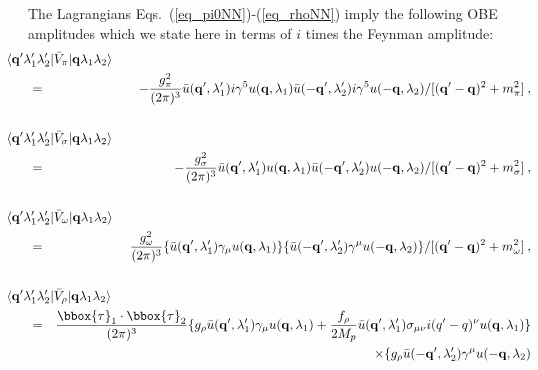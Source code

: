 The Lagrangians Eqs.~(\ref{eq_pi0NN})-(\ref{eq_rhoNN})
imply the following OBE amplitudes
which we state here in terms of $i$ times the Feynman amplitude:
\begin{eqnarray}
\lefteqn{\hspace{-.6cm}\langle {\bf  q'} \lambda_{1}'\lambda_{2}'
|\bar{V}_{\pi}|
{\bf  q}\lambda_{1}\lambda_{2}\rangle} \nonumber \\
 & = &
 - \frac{g^{2}_{\pi}
 }{(2\pi)^{3}}
  \bar{u}({\bf  q'},\lambda_{1}') i \gamma^{5}
 u({\bf  q},\lambda_{1}) 
 \bar{u}({\bf  -q'},\lambda_{2}') i \gamma^{5}
 u({\bf  -q},\lambda_{2}) 
 /[({\bf  q'-q})^{2}+m_{\pi}^{2}] 
\: ,
\label{31.6}\\
\nonumber \\
\lefteqn{\hspace{-.6cm}\langle {\bf  q'} \lambda_{1}'\lambda_{2}'
|\bar{V}_{\sigma}|
{\bf  q}\lambda_{1}\lambda_{2}\rangle}\nonumber \\
 & = & -\frac{g^{2}_{\sigma}}{(2\pi)^3}
\bar{u}({\bf  q'},\lambda_{1}')    u({\bf  q},\lambda_{1})
\bar{u}({\bf  -q'},\lambda_{2}')   u({\bf  -q},\lambda_{2})
  /[({\bf  q'-q})^{2}+m_{\sigma}^{2}] 
\: ,
\label{31.8}\\
\nonumber \\
\lefteqn{\hspace{-.6cm}\langle {\bf  q'} \lambda_{1}'\lambda_{2}'
|\bar{V}_{\omega}|
{\bf  q}\lambda_{1}\lambda_{2}\rangle}\nonumber \\
 &  = &
\frac{g^2_{\omega}}{(2\pi)^3} 
\{ \bar{u}({\bf  q'},\lambda_{1}')  
   \gamma_{\mu} u({\bf  q},\lambda_{1}) \}
\{ \bar{u}({\bf  -q'},\lambda_{2}')
  \gamma^{\mu} u({\bf  -q},\lambda_{2}) \}
  /[({\bf  q'-q})^{2}+m_{\omega}^{2}]
\: ,
\label{31.8a}\\
\nonumber \\
\lefteqn{\hspace{-.6cm}\langle {\bf  q'} \lambda_{1}'\lambda_{2}'
|\bar{V}_{\rho}|
{\bf  q}\lambda_{1}\lambda_{2}\rangle}\nonumber \\
 &  = &
 \frac{\bbox{\tau}_1 \cdot \bbox{\tau}_2}{(2\pi)^3} 
\{g_{\rho}
\bar{u}({\bf  q'},\lambda_{1}')  \gamma_{\mu} u({\bf  q},\lambda_{1})
+\frac{f_{\rho}}{2M_p}
\bar{u}({\bf  q'},\lambda_{1}')
\sigma_{\mu\nu}i(q'-q)^{\nu}
 u({\bf  q},\lambda_{1})\}
\nonumber \\ & & \times
\{g_{\rho}\bar{u}({\bf  -q'},\lambda_{2}')
  \gamma^{\mu} u({\bf  -q},\lambda_{2})

\end{eqnarray}
